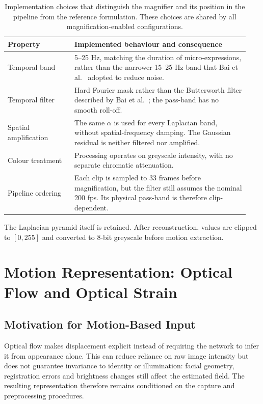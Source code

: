 \begin{table}[htbp]
    \centering
    \small
    \begin{tabular}{@{}p{0.26\linewidth} p{0.68\linewidth}@{}}
        \hline
        \textbf{Property} & \textbf{Implemented behaviour and consequence} \\
        \hline
        Temporal band & 5--25 Hz, matching the duration of micro-expressions, rather than the narrower 15--25 Hz band that Bai et al.~\cite{bai2021} adopted to reduce noise. \\
        Temporal filter & Hard Fourier mask rather than the Butterworth filter described by Bai et al.~\cite{bai2021}; the pass-band has no smooth roll-off. \\
        Spatial amplification & The same $\alpha$ is used for every Laplacian band, without spatial-frequency damping. The Gaussian residual is neither filtered nor amplified. \\
        Colour treatment & Processing operates on greyscale intensity, with no separate chromatic attenuation. \\
        Pipeline ordering & Each clip is sampled to 33 frames before magnification, but the filter still assumes the nominal 200 fps. Its physical pass-band is therefore clip-dependent. \\
        \hline
    \end{tabular}
    \caption[EVM implementation departures]{Implementation choices that distinguish the magnifier and its position in the pipeline from the reference formulation. These choices are shared by all magnification-enabled configurations.}
    \label{tab:ch2-evm-departures}
\end{table}

The Laplacian pyramid itself is retained. After reconstruction, values are clipped to $[0,255]$ and converted to 8-bit greyscale before motion extraction.


\section{Motion Representation: Optical Flow and Optical Strain}
\label{sec:video-to-motion}

\subsection{Motivation for Motion-Based Input}
\label{sec:why-motion}

Optical flow makes displacement explicit instead of requiring the network to infer it from appearance alone. This can reduce reliance on raw image intensity but does not guarantee invariance to identity or illumination: facial geometry, registration errors and brightness changes still affect the estimated field. The resulting representation therefore remains conditioned on the capture and preprocessing procedures.

